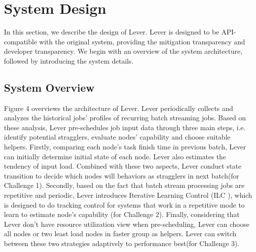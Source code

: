 \documentclass[10pt,conference,compsocconf,letterpaper]{IEEEtran}
\begin{document}
\section{System Design}

  In this section, we describe the design of Lever. Lever is designed to be API-compatible with the original system, providing the mitigation transparency and developer transparency. We begin with an overview of the system architecture, followed by introducing the system details.

\subsection{System Overview}

  Figure 4 overviews the architecture of Lever. Lever periodically collects and analyzes the historical jobs' profiles of recurring batch streaming jobs. Based on these analysis, Lever pre-schedules job input data through three main steps, i.e. identify potential stragglers, evaluate nodes' capability and choose suitable helpers. Firstly, comparing each node's task finish time in previous batch, Lever can initially determine initial state of each node. Lever also estimates the tendency of input load. Combined with these two aspects, Lever conduct state transition to decide which nodes will behaviors as stragglers in next batch(for Challenge 1). Secondly, based on the fact that batch stream processing jobs are repetitive and periodic, Lever introduces Iterative Learning Control (ILC \cite{Arimoto}), which is designed to do tracking control for systems that work in a repetitive mode to learn to estimate node's capability (for Challenge 2). Finally, considering that Lever don't have resource utilization view when pre-scheduling, Lever can choose all nodes or two least load nodes in faster group as helpers. Lever can switch between these two strategies adaptively to performance best(for Challenge 3).
\end{document}
